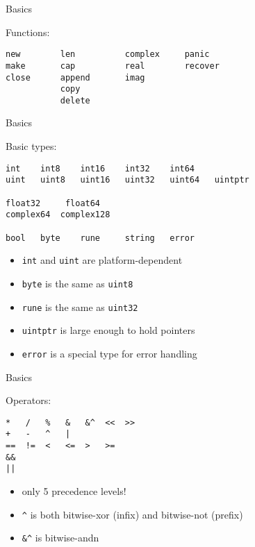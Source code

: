 \documentclass[10pt]{beamer}
\begin{document}

	\begin{frame}[t,fragile]{Basics}
		\begin{center}
			Functions:
		\end{center}
		\begin{verbatim}
new        len          complex     panic
make       cap          real        recover
close      append       imag
           copy 
           delete
		\end{verbatim}
\end{frame}


	\begin{frame}[t,fragile]{Basics}
		\begin{center}
			Basic types:
		\end{center}
		\begin{verbatim}
int    int8    int16    int32    int64
uint   uint8   uint16   uint32   uint64   uintptr

float32     float64
complex64  complex128

bool   byte    rune     string   error
		\end{verbatim}
		\vspace*{-4ex}
		\begin{itemize}
			\item \texttt{int} and \texttt{uint} are platform-dependent
			\item \texttt{byte} is the same as \texttt{uint8}
			\item \texttt{rune} is the same as \texttt{uint32}
			\item \texttt{uintptr} is large enough to hold pointers
			\item \texttt{error} is a special type for error handling
		\end{itemize}
\end{frame}
	
	
	\begin{frame}[t,fragile]{Basics}
		\begin{center}
			Operators:
		\end{center}
		\begin{verbatim}
*   /   %   &   &^  <<  >>
+   -   ^   |
==  !=  <   <=  >   >=
&&
||
		\end{verbatim}
		\vspace*{-4ex}
		\begin{itemize}
			\item only 5 precedence levels!
			\item \texttt{^} is both bitwise-xor (infix) and bitwise-not (prefix)
			\item \texttt{&^} is bitwise-andn
		\end{itemize}
\end{frame}
	
\end{document}

